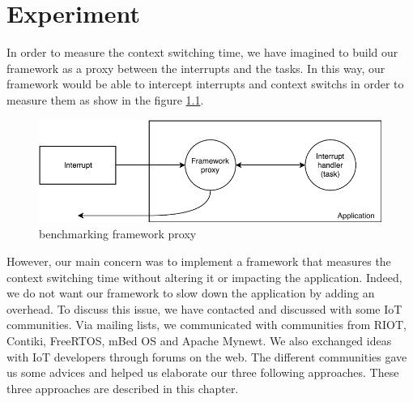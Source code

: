 \chapter{Experiment \label{chap:experiment}}

In order to measure the context switching time, we have imagined to build our framework as a proxy between the interrupts and the tasks.
In this way, our framework would be able to intercept interrupts and context switchs in order to measure them as show in the figure \ref{fig:proxy-framework}.

\begin{figure}[!ht]
  \centering
  \includegraphics[scale=1]{assets/proxy-framework.pdf}
  \caption{benchmarking framework proxy\label{fig:proxy-framework}}
\end{figure}


However, our main concern was to implement a framework that measures the context switching time without altering it or impacting the application.
Indeed, we do not want our framework to slow down the application by adding an overhead.
To discuss this issue, we have contacted and discussed with some IoT communities.
Via mailing lists, we communicated with communities from RIOT, Contiki, FreeRTOS, mBed OS and Apache Mynewt.
We also exchanged ideas with IoT developers through forums on the web.
The different communities gave us some advices and helped us elaborate our three following approaches.
These three approaches are described in this chapter.



